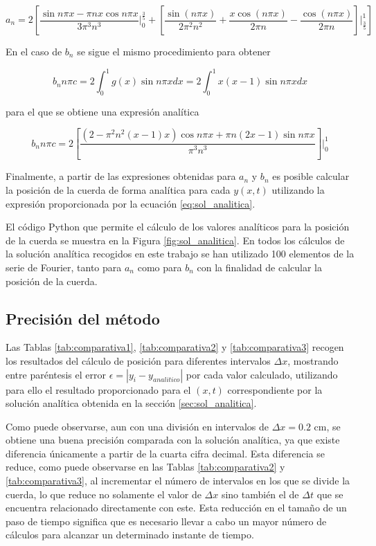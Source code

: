 \documentclass[11pt]{article}
\begin{document}
\begin{equation}
	a_n = 2 [\frac{\sin{n\pi{x}} - \pi{n}x\cos{n\pi{x}}}{3\pi^3n^3}\rvert_0^\frac{3}{5}
	+ [\frac{\sin(n\pi{x})}{2\pi^2n^2} + \frac{x\cos(n\pi{x})}{2\pi{n}} - \frac{\cos(n\pi{x})}{2\pi{n}}]\rvert_{\frac{3}{5}}^1]
\end{equation}

En el caso de $b_n$ se sigue el mismo procedimiento para obtener

\begin{equation}
	b_n n\pi{c} = 2 \int_0^1 g(x) \sin{n\pi{x}}dx = 2 \int_0^1 x(x-1) \sin{n\pi{x}}dx 
\end{equation}

para el que se obtiene una expresión analítica

\begin{equation}
	b_n n\pi{c} = 2[\frac{(2 - \pi^2n^2(x-1)x)\cos{n\pi{x}} + \pi{n}(2x - 1)\sin{n\pi{x}}}{\pi^3n^3}]\rvert_0^1 
\end{equation}

Finalmente, a partir de las expresiones obtenidas para $a_n$ y $b_n$ es posible calcular
la posición de la cuerda de forma analítica para cada $y(x,t)$ utilizando la expresión
proporcionada por la ecuación \eqref{eq:sol_analitica}.

El código Python que permite el cálculo de los valores analíticos para la posición de la
cuerda se muestra en la Figura \ref{fig:sol_analitica}. En todos los cálculos de la solución
analítica recogidos en este trabajo se han utilizado 100 elementos de la serie de Fourier,
tanto para $a_n$ como para $b_n$ con la finalidad de calcular la posición de la cuerda.

\subsection{Precisión del método}

Las Tablas \ref{tab:comparativa1}, \ref{tab:comparativa2} y \ref{tab:comparativa3} recogen
los resultados del cálculo de posición para diferentes intervalos $\Delta{x}$, mostrando
entre paréntesis el error $\epsilon = |y_i - y_{analitico}|$ por cada valor calculado,
utilizando para ello el resultado proporcionado para el $(x,t)$ correspondiente por la
solución analítica obtenida en la sección \ref{sec:sol_analitica}.

Como puede observarse, aun con una división en intervalos de $\Delta{x} = 0.2$ cm, se 
obtiene una buena precisión comparada con la solución analítica, ya que existe diferencia
únicamente a partir de la cuarta cifra decimal. Esta diferencia se reduce, como puede
observarse en las Tablas \ref{tab:comparativa2} y \ref{tab:comparativa3}, al incrementar
el número de intervalos en los que se divide la cuerda, lo que reduce no solamente el
valor de $\Delta{x}$ sino también el de $\Delta{t}$ que se encuentra relacionado
directamente con este. Esta reducción en el tamaño de un paso de tiempo significa que es
necesario llevar a cabo un mayor número de cálculos para alcanzar un determinado instante
de tiempo.
\end{document}
